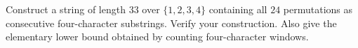 Construct a string of length $33$ over $\{1,2,3,4\}$ containing all $24$ permutations as consecutive four-character substrings. Verify your construction. Also give the elementary lower bound obtained by counting four-character windows.
